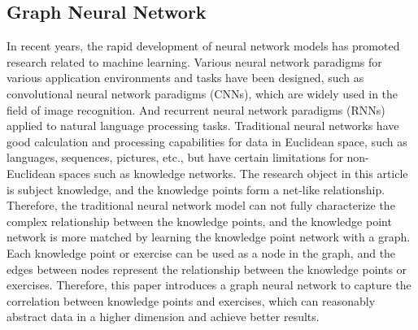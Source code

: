 \subsection{Graph Neural Network}


In recent years, the rapid development of neural network models has promoted research related to machine learning. Various neural network paradigms for various application environments and tasks have been designed, such as convolutional neural network paradigms (CNNs), which are widely used in the field of image recognition. And recurrent neural network paradigms (RNNs) applied to natural language processing tasks. Traditional neural networks have good calculation and processing capabilities for data in Euclidean space, such as languages, sequences, pictures, etc., but have certain limitations for non-Euclidean spaces such as knowledge networks. The research object in this article is subject knowledge, and the knowledge points form a net-like relationship. Therefore, the traditional neural network model can not fully characterize the complex relationship between the knowledge points, and the knowledge point network is more matched by learning the knowledge point network with a graph. Each knowledge point or exercise can be used as a node in the graph, and the edges between nodes represent the relationship between the knowledge points or exercises. Therefore, this paper introduces a graph neural network to capture the correlation between knowledge points and exercises, which can reasonably abstract data in a higher dimension and achieve better results.

